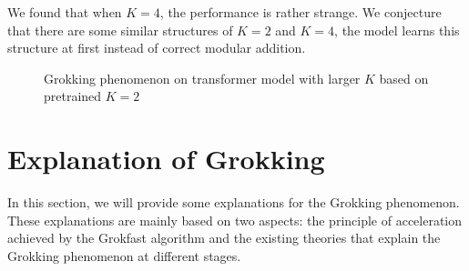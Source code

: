 \documentclass[UTF8]{article}
\begin{document}
We found that when $K=4$, the performance is rather strange. We conjecture
that there are some similar structures of $K=2$ and $K=4$, the model learns
this structure at first instead of correct modular addition.

\begin{figure}[H]
  \centering
  \caption{Grokking phenomenon on transformer model with larger $K$ based on pretrained $K=2$}
  \label{K=4,5,6} 
\end{figure}


\section{Explanation of Grokking}
In this section, we will provide some explanations for the Grokking phenomenon. 
These explanations are mainly based on two aspects: 
the principle of acceleration achieved by the Grokfast algorithm 
and the existing theories that explain the Grokking phenomenon at different stages.
\end{document}
